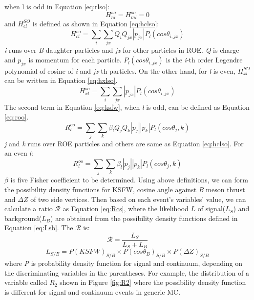 when l is odd in Equation \ref{eq:rlso}: 
\begin{equation}
	H_{nl}^{so}=H_{ml}^{so}=0
\end{equation}
and $H_{cl}^{SO}$ is defined as shown in Equation \ref{eq:hclso}: 
\begin{equation}\label{eq:hclso}
	H_{cl}^{so} = \sum_i \sum_{jx}Q_i Q_{jx}|p_{jx}|P_l(cos\theta_{i,jx})
\end{equation}
\textit{i} runs over \textit{B} daughter particles and \textit{jx} for other particles in ROE. \textit{Q} is charge and $p_{jx}$ is momentum for each particle. $P_l(cos\theta_{i,jx})$ is the \textit{i}-th order Legendre polynomial of cosine of \textit{i} and \textit{jx}-th particles.
On the other hand, for \textit{l} is even, $H_{xl}^{SO}$ can be written in Equation \ref{eq:hxlso}.
\begin{equation}\label{eq:hxlso}
	H_{xl}^{so}=\sum_i \sum_{jx}|p_{jx}|P_l(cos\theta_{i,jx})
\end{equation}
The second term in Equation \ref{eq:ksfw}, when \textit{l} is odd, can be defined as Equation \ref{eq:roo}.
\begin{equation}\label{eq:roo}
	R^{oo}_l = \sum_j \sum_k \beta_l Q_j Q_k |p_j||p_k|P_l(cos\theta_j,k)
\end{equation}
\textit{j} and \textit{k} runs over ROE particles and others are same as Equation \ref{eq:hclso}.
For an even \textit{l}: 
\begin{equation}
	R^{oo}_l = \sum_j \sum_k \beta_l |p_j||p_k|P_l(cos\theta_j,k)
\end{equation}
$\beta$ is five Fisher coefficient to be determined. 
Using above definitions, we can form the possibility density functions for KSFW, cosine angle against \textit{B} meson thrust and $\Delta Z$ of two side vertices.  Then based on each event's variables' value, we can calculate a ratio $\mathcal{R}$ as Equation \ref{eq:Rcs}, where the likelihood $L$ of signal($L_S$) and background($L_B$) are obtained from the possibility density functions defined in Equation \ref{eq:Lsb}.
The $ \mathcal{R} $ is: 
\begin{equation}\label{eq:Rcs}
	\mathcal{R} = \frac{L_S}{L_S+L_B}
\end{equation}
\begin{equation}\label{eq:Lsb}
L_{S/B} = P(KSFW)_{S/B} \times P(cos\theta_B)_{S/B} \times P(\Delta Z)_{S/B}
\end{equation}
where \textit{P} is probability density function for signal and continuum, depending on the discriminating variables in the parentheses. For example, the distribution of a variable called $R_2$ shown in Figure \ref{fig:R2} where the possibility density function is different for signal and continuum events in generic MC.

